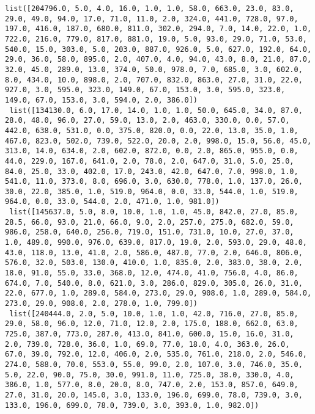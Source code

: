 \documentclass[11pt]{article}
\begin{document}
\begin{Verbatim}[commandchars=\\\{\}]
 list([204796.0, 5.0, 4.0, 16.0, 1.0, 1.0, 58.0, 663.0, 23.0, 83.0, 29.0, 49.0, 94.0, 17.0, 71.0, 11.0, 2.0, 324.0, 441.0, 728.0, 97.0, 197.0, 416.0, 187.0, 680.0, 811.0, 302.0, 294.0, 7.0, 14.0, 22.0, 1.0, 722.0, 216.0, 779.0, 817.0, 881.0, 19.0, 5.0, 93.0, 29.0, 71.0, 53.0, 540.0, 15.0, 303.0, 5.0, 203.0, 887.0, 926.0, 5.0, 627.0, 192.0, 64.0, 29.0, 36.0, 58.0, 895.0, 2.0, 407.0, 4.0, 94.0, 43.0, 8.0, 21.0, 87.0, 32.0, 45.0, 289.0, 13.0, 374.0, 50.0, 978.0, 7.0, 685.0, 3.0, 602.0, 8.0, 434.0, 10.0, 898.0, 2.0, 707.0, 832.0, 863.0, 27.0, 31.0, 22.0, 927.0, 3.0, 595.0, 323.0, 149.0, 67.0, 153.0, 3.0, 595.0, 323.0, 149.0, 67.0, 153.0, 3.0, 594.0, 2.0, 386.0])
 list([134130.0, 6.0, 17.0, 14.0, 1.0, 1.0, 50.0, 645.0, 34.0, 87.0, 28.0, 48.0, 96.0, 27.0, 59.0, 13.0, 2.0, 463.0, 330.0, 0.0, 57.0, 442.0, 638.0, 531.0, 0.0, 375.0, 820.0, 0.0, 22.0, 13.0, 35.0, 1.0, 467.0, 823.0, 502.0, 739.0, 522.0, 20.0, 2.0, 998.0, 15.0, 56.0, 45.0, 313.0, 14.0, 634.0, 2.0, 602.0, 872.0, 0.0, 2.0, 865.0, 955.0, 0.0, 44.0, 229.0, 167.0, 641.0, 2.0, 78.0, 2.0, 647.0, 31.0, 5.0, 25.0, 84.0, 25.0, 33.0, 402.0, 17.0, 243.0, 42.0, 647.0, 7.0, 998.0, 1.0, 541.0, 11.0, 373.0, 8.0, 696.0, 3.0, 630.0, 778.0, 1.0, 137.0, 26.0, 30.0, 22.0, 385.0, 1.0, 519.0, 964.0, 0.0, 33.0, 544.0, 1.0, 519.0, 964.0, 0.0, 33.0, 544.0, 2.0, 471.0, 1.0, 981.0])
 list([145637.0, 5.0, 8.0, 10.0, 1.0, 1.0, 45.0, 842.0, 27.0, 85.0, 28.5, 66.0, 93.0, 21.0, 66.0, 9.0, 2.0, 257.0, 275.0, 682.0, 59.0, 986.0, 258.0, 640.0, 256.0, 719.0, 151.0, 731.0, 10.0, 27.0, 37.0, 1.0, 489.0, 990.0, 976.0, 639.0, 817.0, 19.0, 2.0, 593.0, 29.0, 48.0, 43.0, 118.0, 13.0, 41.0, 2.0, 586.0, 487.0, 77.0, 2.0, 646.0, 806.0, 576.0, 32.0, 503.0, 130.0, 410.0, 1.0, 835.0, 2.0, 383.0, 38.0, 2.0, 18.0, 91.0, 55.0, 33.0, 368.0, 12.0, 474.0, 41.0, 756.0, 4.0, 86.0, 674.0, 7.0, 540.0, 8.0, 621.0, 3.0, 286.0, 829.0, 305.0, 26.0, 31.0, 22.0, 677.0, 1.0, 289.0, 584.0, 273.0, 29.0, 908.0, 1.0, 289.0, 584.0, 273.0, 29.0, 908.0, 2.0, 278.0, 1.0, 799.0])
 list([240444.0, 2.0, 5.0, 10.0, 1.0, 1.0, 42.0, 716.0, 27.0, 85.0, 29.0, 58.0, 96.0, 12.0, 71.0, 12.0, 2.0, 175.0, 188.0, 662.0, 63.0, 725.0, 387.0, 773.0, 287.0, 413.0, 841.0, 600.0, 15.0, 16.0, 31.0, 2.0, 739.0, 728.0, 36.0, 1.0, 69.0, 77.0, 18.0, 4.0, 363.0, 26.0, 67.0, 39.0, 792.0, 12.0, 406.0, 2.0, 535.0, 761.0, 218.0, 2.0, 546.0, 274.0, 588.0, 70.0, 553.0, 55.0, 99.0, 2.0, 107.0, 3.0, 746.0, 35.0, 5.0, 22.0, 90.0, 75.0, 30.0, 991.0, 11.0, 725.0, 38.0, 330.0, 4.0, 386.0, 1.0, 577.0, 8.0, 20.0, 8.0, 747.0, 2.0, 153.0, 857.0, 649.0, 27.0, 31.0, 20.0, 145.0, 3.0, 133.0, 196.0, 699.0, 78.0, 739.0, 3.0, 133.0, 196.0, 699.0, 78.0, 739.0, 3.0, 393.0, 1.0, 982.0])

\end{Verbatim}
\end{document}
